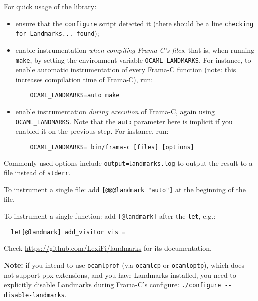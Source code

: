 For quick usage of the library:
\begin{itemize}
\item ensure that the \texttt{configure} script detected it
  (there should be a line \texttt{checking for Landmarks... found});
\item enable instrumentation {\em when compiling Frama-C's files}, that is,
  when running \texttt{make}, by setting the environment variable
  \verb+OCAML_LANDMARKS+. For instance, to enable automatic instrumentation
  of every Frama-C function (note: this increases compilation time of Frama-C),
  run:

\begin{lstlisting}
    OCAML_LANDMARKS=auto make
\end{lstlisting}

\item enable instrumentation {\em during execution} of Frama-C, again using
  \verb+OCAML_LANDMARKS+. Note that the \texttt{auto} parameter here is
  implicit if you enabled it on the previous step.
  For instance, run:

  \begin{lstlisting}
    OCAML_LANDMARKS= bin/frama-c [files] [options]
  \end{lstlisting}
\end{itemize}

Commonly used options include \verb+output=landmarks.log+ to output the result
to a file instead of \texttt{stderr}.

To instrument a single file: add \verb+[@@@landmark "auto"]+ at the beginning
of the file.

To instrument a single function: add \verb+[@landmark]+ after the \texttt{let},
e.g.:

\begin{lstlisting}
  let[@landmark] add_visitor vis =
\end{lstlisting}

Check \url{https://github.com/LexiFi/landmarks} for its documentation.

\textbf{Note:} if you intend to use \texttt{ocamlprof} (via \texttt{ocamlcp} or
\texttt{ocamloptp}), which does not support ppx extensions, and you have
Landmarks installed, you need to explicitly disable Landmarks during Frama-C's
configure: \verb+./configure --disable-landmarks+.

